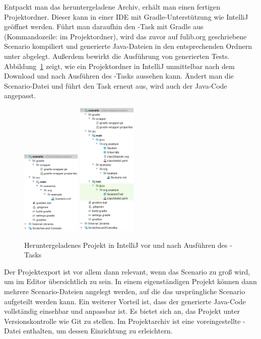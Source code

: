 Entpackt man das heruntergeladene Archiv, erhält man einen fertigen Projektordner.
Dieser kann in einer IDE mit Gradle-Unterstützung wie IntelliJ geöffnet werden.
Führt man daraufhin den -Task mit Gradle aus (Kommandozeile:  im Projektordner), wird das zuvor auf fulib.org geschriebene Scenario kompiliert und generierte Java-Dateien in den entsprechenden Ordnern unter  abgelegt.
Außerdem bewirkt  die Ausführung von generierten Tests.
Abbildung~\ref{fig:project-downloaded} zeigt, wie ein Projektordner in IntelliJ unmittelbar nach dem Download und nach Ausführen des -Tasks aussehen kann.
Ändert man die Scenario-Datei und führt den Task erneut aus, wird auch der Java-Code angepasst.

\begin{figure}
    \centering
    \includegraphics[width=0.25\textwidth]{chapter/fulib.org/img/project-downloaded.png}
    \hspace{0.05\textwidth}
    \includegraphics[width=0.25\textwidth]{chapter/fulib.org/img/project-post-check.png}
    \caption{Heruntergeladenes Projekt in IntelliJ vor und nach Ausführen des -Tasks}
    \label{fig:project-downloaded}
\end{figure}

Der Projektexport ist vor allem dann relevant, wenn das Scenario zu groß wird, um im Editor übersichtlich zu sein.
In einem eigenständigen Projekt können dann mehrere Scenario-Dateien angelegt werden, auf die das ursprüngliche Scenario aufgeteilt werden kann.
Ein weiterer Vorteil ist, dass der generierte Java-Code vollständig einsehbar und anpassbar ist.
Es bietet sich an, das Projekt unter Versionskontrolle wie Git zu stellen.
Im Projektarchiv ist eine voreingestellte -Datei enthalten, um dessen Einrichtung zu erleichtern.

